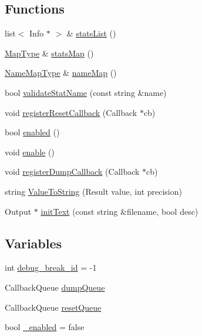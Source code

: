 \subsection*{Functions}
\begin{DoxyCompactItemize}
\item 
list$<$ Info $\ast$ $>$ \& \hyperlink{namespaceStats_a52f464eb02d70d04e60fd6c090366560}{statsList} ()
\item 
\hyperlink{namespaceStats_abf12e88b5899310c1adcf5be61d6bee3}{MapType} \& \hyperlink{namespaceStats_a3eb4a123811e05e9b29748cf23cbdc31}{statsMap} ()
\item 
\hyperlink{namespaceStats_aa5595c5604b2fec03e55b1f32b521595}{NameMapType} \& \hyperlink{namespaceStats_aae51efeedd0840ece6e968c96df90038}{nameMap} ()
\item 
bool \hyperlink{namespaceStats_a6bae8e555771c8cb0819d78c60359656}{validateStatName} (const string \&name)
\item 
void \hyperlink{namespaceStats_a105c595669b79620fce95c825f745bce}{registerResetCallback} (Callback $\ast$cb)
\item 
bool \hyperlink{namespaceStats_ae5a14285f2510051bae7923aa2612d96}{enabled} ()
\item 
void \hyperlink{namespaceStats_a03d2f1935a0ef6250fa5df657a82310b}{enable} ()
\item 
void \hyperlink{namespaceStats_ace78801422912439fb2f81572cc9c373}{registerDumpCallback} (Callback $\ast$cb)
\item 
string \hyperlink{namespaceStats_abf675b5476be37bbbe5d1abacbe4071e}{ValueToString} (Result value, int precision)
\item 
Output $\ast$ \hyperlink{namespaceStats_aff4528f6c0e99aac2ae6bfbba25349aa}{initText} (const string \&filename, bool desc)
\end{DoxyCompactItemize}
\subsection*{Variables}
\begin{DoxyCompactItemize}
\item 
int \hyperlink{namespaceStats_abacf74f0010f42902b864f51751d05c9}{debug\_\-break\_\-id} = -\/1
\item 
CallbackQueue \hyperlink{namespaceStats_a84952ecad0a9644e0ea9526b3736c8b7}{dumpQueue}
\item 
CallbackQueue \hyperlink{namespaceStats_a052117624dd534c773035ba2e03f4474}{resetQueue}
\item 
bool \hyperlink{namespaceStats_ae793c31e3372c51a4996ce57cc219a54}{\_\-enabled} = false
\end{DoxyCompactItemize}


